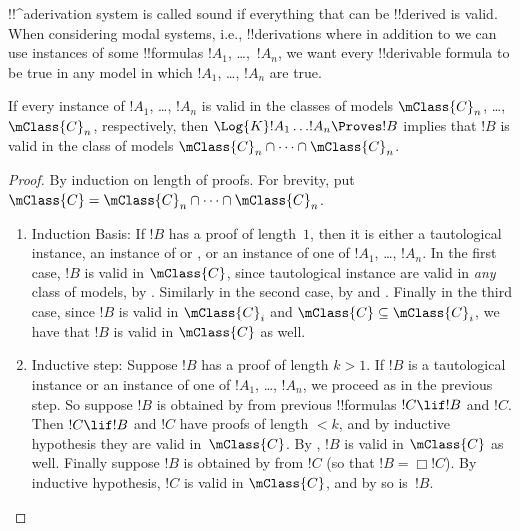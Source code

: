 \documentclass[../../../include/open-logic-section]{subfiles}
\begin{document}


!!^a{derivation} system is called sound if everything that can be
!!{derive}d is valid. When considering modal systems, i.e.,
!!{derivation}s where in addition to  we can use instances of
some !!{formula}s $!A_1$, \dots,~$!A_n$, we want every !!{derivable}
formula to be true in any model in which $!A_1$, \dots, $!A_n$ are
true.  

\begin{thm}
  If every instance of $!A_1$, \dots, $!A_n$ is valid in the
  classes of models $\mClass{C}_n$, \dots, $\mClass{C}_n$,
  respectively, then $\Log{K}!A_1\dots !A_n
  \Proves !B$ implies that $!B$ is valid in the class of
  models $\mClass{C}_n \cap \dots \cap \mClass{C}_n$.
\end{thm}

\begin{proof}
  By induction on length of proofs. For brevity, put $\mClass{C} =
  \mClass{C}_n \cap \dots \cap \mClass{C}_n$.
  \begin{enumerate}
  \item Induction Basis: If $!B$ has a proof of length~$1$, then it is
    either a tautological instance, an instance of  or \Dual{},
    or an instance of one of $!A_1$, \dots, $!A_n$. In the first case,
    $!B$ is valid in $\mClass{C}$, since tautological instance are
    valid in \emph{any} class of models, by
    . Similarly in the second case, by
     and
    . Finally in the third case,
    since $!B$ is valid in $\mClass{C}_i$ and $\mClass{C} \subseteq
    \mClass{C}_i$, we have that $!B$ is valid in $\mClass{C}$ as well.
  \item Inductive step: Suppose $!B$ has a proof of length $k>1$. If
    $!B$ is a tautological instance or an instance of one of $!A_1$,
    \dots, $!A_n$, we proceed as in the previous step. So suppose $!B$ is
    obtained by \MP{} from previous !!{formula}s $!C \lif !B$ and
    $!C$. Then $!C \lif !B$ and $!C$ have proofs of length $<k$, and
    by inductive hypothesis they are valid in~$\mClass{C}$. By
    , $!B$ is valid in $\mClass{C}$ as
    well. Finally suppose $!B$ is obtained by \Nec{} from $!C$ (so
    that $!B = \Box!C$). By inductive hypothesis, $!C$ is valid in
    $\mClass{C}$, and by  so is~$!B$. \qedhere
  \end{enumerate}
\end{proof}
\end{document}
